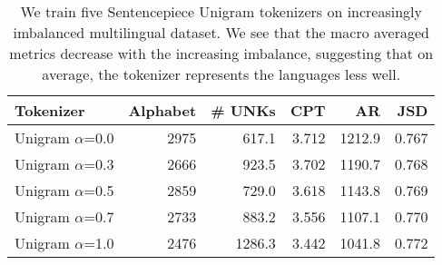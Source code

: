 \begin{table}
\caption{We train five Sentencepiece Unigram tokenizers on increasingly imbalanced multilingual dataset. We see that the macro averaged metrics decrease with the increasing imbalance, suggesting that on average, the tokenizer represents the languages less well.}
\label{tab:data_balance_metrics}
\begin{tabular}{lrrrrr}
\toprule
Tokenizer & Alphabet & \# UNKs & CPT & AR & JSD \\
\midrule
Unigram $\alpha$=0.0 & 2975 & 617.1 & 3.712 & 1212.9 & 0.767 \\
Unigram $\alpha$=0.3 & 2666 & 923.5 & 3.702 & 1190.7 & 0.768 \\
Unigram $\alpha$=0.5 & 2859 & 729.0 & 3.618 & 1143.8 & 0.769 \\
Unigram $\alpha$=0.7 & 2733 & 883.2 & 3.556 & 1107.1 & 0.770 \\
Unigram $\alpha$=1.0 & 2476 & 1286.3 & 3.442 & 1041.8 & 0.772 \\
\bottomrule
\end{tabular}
\end{table}
